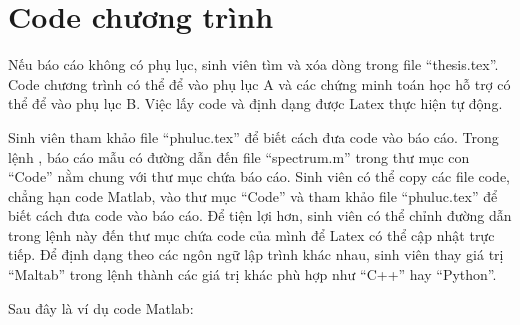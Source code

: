 \chapter{Code chương trình}

Nếu báo cáo không có phụ lục, sinh viên tìm và xóa dòng \verb|| trong file ``thesis.tex''.
Code chương trình có thể để vào phụ lục A và các chứng minh toán học hỗ trợ có thể để vào phụ lục B.
Việc lấy code và định dạng được Latex thực hiện tự động.

Sinh viên tham khảo file ``phuluc.tex'' để biết cách đưa code vào báo cáo.
Trong lệnh \verb||, báo cáo mẫu có đường dẫn đến file ``spectrum.m'' trong thư mục con ``Code'' nằm chung với thư mục chứa báo cáo.
Sinh viên có thể copy các file code, chẳng hạn code Matlab, vào thư mục ``Code'' và tham khảo file ``phuluc.tex'' để biết cách đưa code vào báo cáo.
Để tiện lợi hơn, sinh viên có thể chỉnh đường dẫn trong lệnh này đến thư mục chứa code của mình để Latex có thể cập nhật trực tiếp.
Để định dạng theo các ngôn ngữ lập trình khác nhau, sinh viên thay giá trị ``Maltab'' trong lệnh thành các giá trị khác phù hợp như ``C++'' hay ``Python''. 

Sau đây là ví dụ code Matlab:

\small

